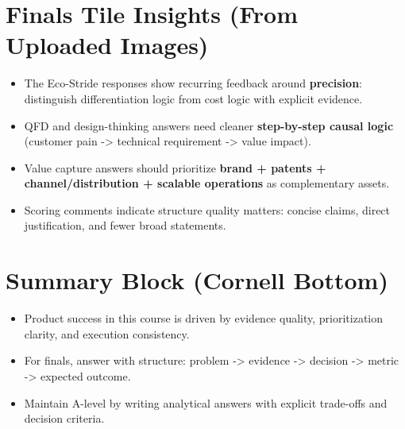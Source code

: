 \documentclass[10pt,a4paper]{article}
\begin{document}
\section*{Finals Tile Insights (From Uploaded Images)}
\begin{itemize}
  \item The Eco-Stride responses show recurring feedback around \textbf{precision}: distinguish differentiation logic from cost logic with explicit evidence.
  \item QFD and design-thinking answers need cleaner \textbf{step-by-step causal logic} (customer pain -> technical requirement -> value impact).
  \item Value capture answers should prioritize \textbf{brand + patents + channel/distribution + scalable operations} as complementary assets.
  \item Scoring comments indicate structure quality matters: concise claims, direct justification, and fewer broad statements.
\end{itemize}

\section*{Summary Block (Cornell Bottom)}
\begin{itemize}
  \item Product success in this course is driven by evidence quality, prioritization clarity, and execution consistency.
  \item For finals, answer with structure: problem -> evidence -> decision -> metric -> expected outcome.
  \item Maintain A-level by writing analytical answers with explicit trade-offs and decision criteria.
\end{itemize}
\end{document}
